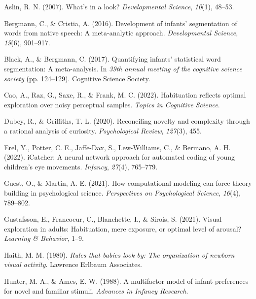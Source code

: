 \documentclass[10pt, letterpaper]{article}
\newenvironment{CSLReferences}%
  {}%
  {\par}
\begin{document}
\hypertarget{refs}{}
\begin{CSLReferences}{1}{0}
\leavevmode{}%
Aslin, R. N. (2007). What's in a look? \emph{Developmental Science},
\emph{10}(1), 48--53.

\leavevmode{}%
Bergmann, C., \& Cristia, A. (2016). Development of infants'
segmentation of words from native speech: A meta-analytic approach.
\emph{Developmental Science}, \emph{19}(6), 901--917.

\leavevmode{}%
Black, A., \& Bergmann, C. (2017). Quantifying infants' statistical word
segmentation: A meta-analysis. In \emph{39th annual meeting of the
cognitive science society} (pp. 124--129). Cognitive Science Society.

\leavevmode{}%
Cao, A., Raz, G., Saxe, R., \& Frank, M. C. (2022). Habituation reflects
optimal exploration over noisy perceptual samples. \emph{Topics in
Cognitive Science}.

\leavevmode{}%
Dubey, R., \& Griffiths, T. L. (2020). Reconciling novelty and
complexity through a rational analysis of curiosity. \emph{Psychological
Review}, \emph{127}(3), 455.

\leavevmode{}%
Erel, Y., Potter, C. E., Jaffe-Dax, S., Lew-Williams, C., \& Bermano, A.
H. (2022). iCatcher: A neural network approach for automated coding of
young children's eye movements. \emph{Infancy}, \emph{27}(4), 765--779.

\leavevmode{}%
Guest, O., \& Martin, A. E. (2021). How computational modeling can force
theory building in psychological science. \emph{Perspectives on
Psychological Science}, \emph{16}(4), 789--802.

\leavevmode{}%
Gustafsson, E., Francoeur, C., Blanchette, I., \& Sirois, S. (2021).
Visual exploration in adults: Habituation, mere exposure, or optimal
level of arousal? \emph{Learning \& Behavior}, 1--9.

\leavevmode{}%
Haith, M. M. (1980). \emph{Rules that babies look by: The organization
of newborn visual activity}. Lawrence Erlbaum Associates.

\leavevmode{}%
Hunter, M. A., \& Ames, E. W. (1988). A multifactor model of infant
preferences for novel and familiar stimuli. \emph{Advances in Infancy
Research}.


\end{CSLReferences}
\end{document}
